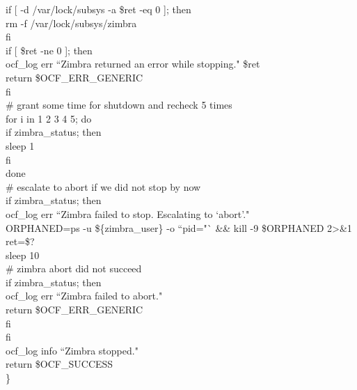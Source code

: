 \documentclass[a4paper, 12pt]{book}
\begin{document}
    \indent if [ -d /var/lock/subsys -a \$ret -eq 0 ]; then\\
      \indent \indent rm -f /var/lock/subsys/zimbra\\
    \indent fi\\

    \indent if [ \$ret -ne 0 ]; then\\
        \indent \indent ocf\_log err ``Zimbra returned an error while stopping." \$ret\\
        \indent \indent return \$OCF\_ERR\_GENERIC\\
    \indent fi\\

    \indent \# grant some time for shutdown and recheck 5 times\\
    \indent for i in 1 2 3 4 5; do\\
        \indent \indent if zimbra\_status; then\\
            \indent \indent \indent sleep 1\\
        \indent \indent fi\\
    \indent done\\

    \indent \# escalate to abort if we did not stop by now\\
    \indent if zimbra\_status; then\\
        \indent \indent ocf\_log err ``Zimbra failed to stop. Escalating to `abort'."\\

        \indent \indent ORPHANED=\textasciigrave ps -u \$\{zimbra\_user\} -o ``pid="` \&\& kill -9 \$ORPHANED 2\textgreater\&1\\
        \indent \indent ret=\$?\\
        \indent \indent sleep 10\\

        \indent \indent \# zimbra abort did not succeed\\
        \indent \indent if zimbra\_status; then\\
            \indent \indent \indent ocf\_log err ``Zimbra failed to abort."\\
            \indent \indent \indent return \$OCF\_ERR\_GENERIC\\
        \indent \indent fi\\
    \indent fi\\

    \indent ocf\_log info ``Zimbra stopped."\\
    \indent return \$OCF\_SUCCESS\\
\}\\
\end{document}

